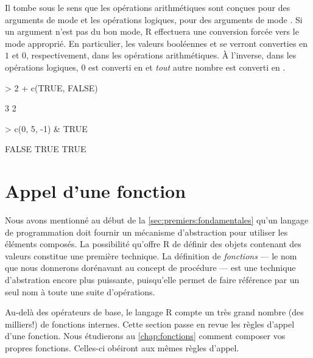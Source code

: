 
Il tombe sous le sens que les opérations arithmétiques sont conçues
pour des arguments de mode  et les
opérations logiques, pour des arguments de mode . Si un
argument n'est pas du bon mode, R effectuera une conversion forcée vers le mode approprié. En particulier, les
valeurs booléennes  et  se verront converties
en $1$ et $0$, respectivement, dans les opérations arithmétiques. À
l'inverse, dans les opérations logiques, $0$ est converti en
 et \emph{tout} autre nombre est converti en
.
\begin{Schunk}
\begin{Sinput}
> 2 + c(TRUE, FALSE)
\end{Sinput}
\begin{Soutput}
[1] 3 2
\end{Soutput}
\begin{Sinput}
> c(0, 5, -1) & TRUE
\end{Sinput}
\begin{Soutput}
[1] FALSE  TRUE  TRUE
\end{Soutput}
\end{Schunk}


\section{Appel d'une fonction}
\label{sec:premiers:appel}

Nous avons mentionné au début de la
\autoref{sec:premiers:fondamentales} qu'un langage de programmation
doit fournir un mécanisme d'abstraction pour utiliser les éléments
composés. La possibilité qu'offre R de définir des objets contenant
des valeurs constitue une première technique. La définition de
\emph{fonctions} --- le nom que nous donnerons
dorénavant au concept de procédure --- est une
technique d'abstration encore plus puissante, puisqu'elle permet de
faire référence par un seul nom à toute une suite d'opérations.

Au-delà des opérateurs de base, le langage R compte un très grand
nombre (des milliers!) de fonctions internes. Cette section passe en
revue les règles d'appel d'une fonction. Nous étudierons au
\autoref{chap:fonctions} comment composer vos propres fonctions.
Celles-ci obéiront aux mêmes règles d'appel.


